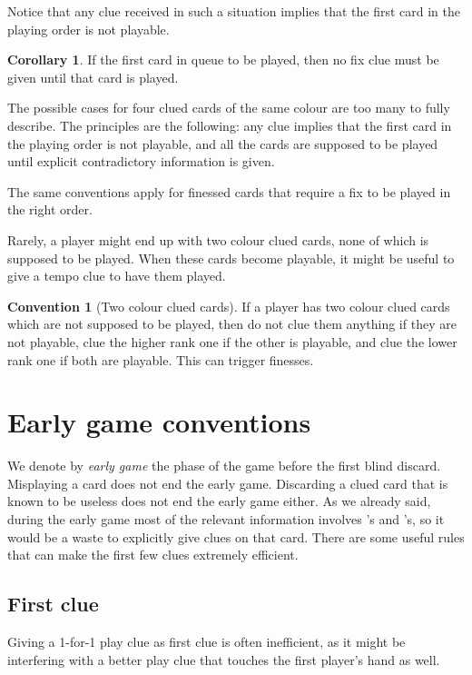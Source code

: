 \documentclass[a4paper]{article}
\theoremstyle{plain}
\theoremstyle{definition}
\newtheorem{corollary}[theorem]{Corollary}
\newtheorem{convention}[theorem]{Convention}
\begin{document}
Notice that any clue received in such a situation implies that the first card in the playing order is not playable.

\begin{corollary}
	If the first card in queue to be played, then no fix clue must be given until that card is played.
\end{corollary}

The possible cases for four clued cards of the same colour are too many to fully describe. The principles are the following: any clue implies that the first card in the playing order is not playable, and all the cards are supposed to be played until explicit contradictory information is given.

The same conventions apply for finessed cards that require a fix to be played in the right order.

Rarely, a player might end up with two colour clued cards, none of which is supposed to be played. When these cards become playable, it might be useful to give a tempo clue to have them played.

\begin{convention}[Two colour clued cards]
	If a player has two colour clued cards which are not supposed to be played, then do not clue them anything if they are not playable, clue the higher rank one if the other is playable, and clue the lower rank one if both are playable. This can trigger finesses.
\end{convention}

\section{Early game conventions}
\label{sec:early-game}

We denote by \emph{early game} the phase of the game before the first blind discard. Misplaying a card does not end the early game. Discarding a clued card that is known to be useless does not end the early game either. As we already said, during the early game most of the relevant information involves 's and 's, so it would be a waste to explicitly give clues on that card. There are some useful rules that can make the first few clues extremely efficient.

\subsection{First clue}

Giving a 1-for-1 play clue as first clue is often inefficient, as it might be interfering with a better play clue that touches the first player's hand as well.
\end{document}
